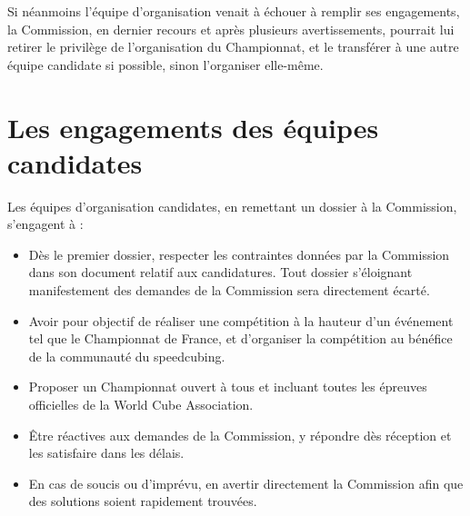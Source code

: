 \documentclass[a4paper,12pt]{scrartcl}
\begin{document}
Si néanmoins l'équipe d'organisation venait à échouer à remplir ses engagements, la Commission, en dernier recours et après plusieurs avertissements, pourrait lui retirer le privilège de l'organisation du Championnat, et le transférer à une autre équipe candidate si possible, sinon l'organiser elle-même.

\section*{Les engagements des équipes candidates}
Les équipes d'organisation candidates, en remettant un dossier à la Commission, s'engagent à :
\begin{itemize}
\item Dès le premier dossier, respecter les contraintes données par la Commission dans son document relatif aux candidatures. Tout dossier s'éloignant manifestement des demandes de la Commission sera directement écarté.
\item Avoir pour objectif de réaliser une compétition à la hauteur d'un événement tel que le Championnat de France, et d'organiser la compétition au bénéfice de la communauté du speedcubing.
\item Proposer un Championnat ouvert à tous et incluant toutes les épreuves officielles de la World Cube Association.
\item Être réactives aux demandes de la Commission, y répondre dès réception et les satisfaire dans les délais.
\item En cas de soucis ou d'imprévu, en avertir directement la Commission afin que des solutions soient rapidement trouvées.
\end{itemize}


\end{document}
